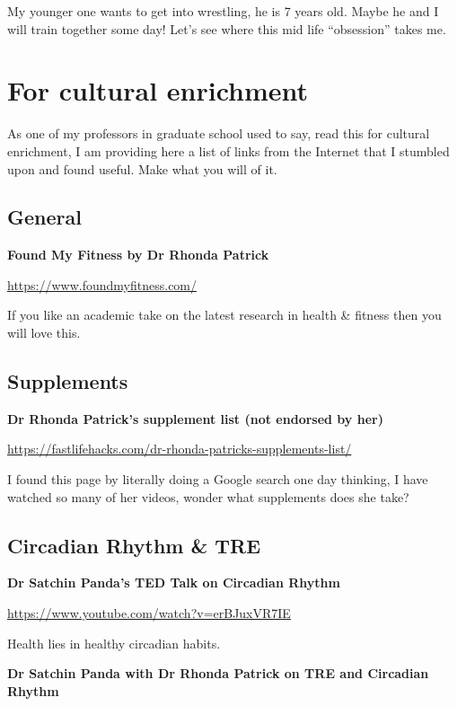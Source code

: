\documentclass[
  oneside]{book}
\begin{document}
My younger one wants to get into wrestling, he is 7 years old. Maybe he and I will train together some day! Let's see where this mid life ``obsession'' takes me.

\hypertarget{for-cultural-enrichment}{%
\chapter{For cultural enrichment}\label{for-cultural-enrichment}}

As one of my professors in graduate school used to say, read this for cultural enrichment, I am providing here a list of links from the Internet that I stumbled upon and found useful. Make what you will of it.

\hypertarget{general}{%
\section{General}\label{general}}

\textbf{Found My Fitness by Dr Rhonda Patrick}

\url{https://www.foundmyfitness.com/}

If you like an academic take on the latest research in health \& fitness then you will love this.

\hypertarget{supplements}{%
\section{Supplements}\label{supplements}}

\textbf{Dr Rhonda Patrick's supplement list (not endorsed by her)}

\url{https://fastlifehacks.com/dr-rhonda-patricks-supplements-list/}

I found this page by literally doing a Google search one day thinking, I have watched so many of her videos, wonder what supplements does she take?

\hypertarget{circadian-rhythm-tre}{%
\section{Circadian Rhythm \& TRE}\label{circadian-rhythm-tre}}

\textbf{Dr Satchin Panda's TED Talk on Circadian Rhythm}

\url{https://www.youtube.com/watch?v=erBJuxVR7IE}

Health lies in healthy circadian habits.

\textbf{Dr Satchin Panda with Dr Rhonda Patrick on TRE and Circadian Rhythm}
\end{document}
